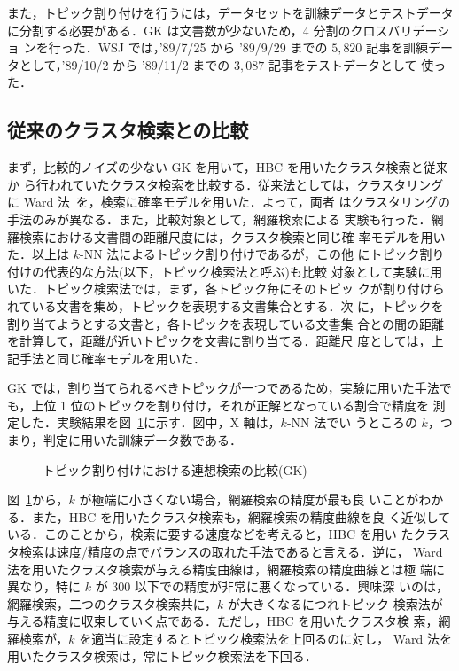 また，トピック割り付けを行うには，データセットを訓練データとテストデータ
に分割する必要がある．GK は文書数が少ないため，4 分割のクロスバリデーショ
ンを行った．WSJ では，'89/7/25 から '89/9/29 までの $5,820$ 記事を訓練デー
タとして，'89/10/2 から '89/11/2 までの $3,087$ 記事をテストデータとして
使った．

\subsection{従来のクラスタ検索との比較}

まず，比較的ノイズの少ない GK を用いて，HBC を用いたクラスタ検索と従来か
ら行われていたクラスタ検索を比較する．従来法としては，クラスタリングに 
Ward 法~\cite{anderberg:73:a}を，検索に確率モデルを用いた．よって，両者
はクラスタリングの手法のみが異なる．また，比較対象として，網羅検索による
実験も行った．網羅検索における文書間の距離尺度には，クラスタ検索と同じ確
率モデルを用いた．以上は $k$-NN 法によるトピック割り付けであるが，この他
にトピック割り付けの代表的な方法(以下，{\gt トピック検索法}と呼ぶ)も比較
対象として実験に用いた．トピック検索法では，まず，各トピック毎にそのトピッ
クが割り付けられている文書を集め，トピックを表現する文書集合とする．次
に，トピックを割り当てようとする文書と，各トピックを表現している文書集
合との間の距離を計算して，距離が近いトピックを文書に割り当てる．距離尺
度としては，上記手法と同じ確率モデルを用いた．

GK では，割り当てられるべきトピックが一つであるため，実験に用いた手法で
も，上位 1 位のトピックを割り付け，それが正解となっている割合で精度を
測定した．実験結果を図~\ref{fig:gk}に示す．図中，X 軸は，$k$-NN 法でい
うところの $k$，つまり，判定に用いた訓練データ数である．

\begin{figure}
 \begin{center}
   
   
 \end{center}
 \vspace{-2mm}
 \caption{トピック割り付けにおける連想検索の比較(GK)}
 \label{fig:gk}
 \vspace{-2mm}
\end{figure}

図~\ref{fig:gk}から，$k$ が極端に小さくない場合，網羅検索の精度が最も良
いことがわかる．また，HBC を用いたクラスタ検索も，網羅検索の精度曲線を良
く近似している．このことから，検索に要する速度などを考えると，HBC を用い
たクラスタ検索は速度/精度の点でバランスの取れた手法であると言える．逆に，
Ward 法を用いたクラスタ検索が与える精度曲線は，網羅検索の精度曲線とは極
端に異なり，特に $k$ が $300$ 以下での精度が非常に悪くなっている．興味深
いのは，網羅検索，二つのクラスタ検索共に，$k$ が大きくなるにつれトピック
検索法が与える精度に収束していく点である．ただし，HBC を用いたクラスタ検
索，網羅検索が，$k$ を適当に設定するとトピック検索法を上回るのに対し，
Ward 法を用いたクラスタ検索は，常にトピック検索法を下回る．

